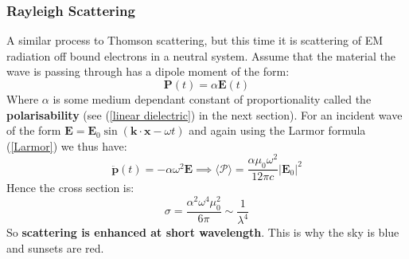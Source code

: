 \documentclass[a4paper]{article}
\numberwithin{equation}{section}
\begin{document}
\subsubsection{Rayleigh Scattering}
A similar process to Thomson scattering, but this time it is scattering of EM radiation off bound electrons in a neutral system. Assume that the material the wave is passing through has a dipole moment of the form:
\begin{equation}
\bm{P}(t) = \alpha \bm{E}(t)
\end{equation}
Where $\alpha$ is some medium dependant constant of proportionality called the \textbf{polarisability} (see (\ref{linear dielectric}) in the next section). For an incident wave of the form $\bm{E} =\bm{E}_0 \sin (\bm{k} \cdot \bm{x} - \omega t)$ and again using the Larmor formula (\ref{Larmor}) we thus have:
\begin{equation}
\ddot{\bm{p}}(t) = - \alpha \omega^2 \bm{E} \implies \langle \mathcal{P} \rangle = \frac{\alpha \mu_0 \omega^2}{12 \pi c}|\bm{E}_0|^2
\end{equation}
Hence the cross section is:
\begin{equation}
\sigma = \frac{\alpha^2 \omega ^4 \mu_0^2}{6\pi} \sim \frac{1}{\lambda^4}
\end{equation}
So \textbf{scattering is enhanced at short wavelength}. This is why the sky is blue and sunsets are red.
\end{document}
